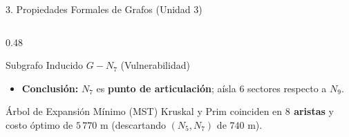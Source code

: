\documentclass[aspectratio=169]{beamer}
\begin{document}
\begin{frame}{3. Propiedades Formales de Grafos (Unidad 3)}
\begin{columns}[T]
\begin{column}{0.48\textwidth}
\begin{alertblock}{Subgrafo Inducido $G - N_7$ (Vulnerabilidad)}
\begin{itemize}
                    \item \textbf{Conclusión:} $N_7$ es \textbf{punto de articulación}; aísla $6$ sectores respecto a $N_9$.
                \end{itemize}
            \end{alertblock}
            \begin{block}{Árbol de Expansión Mínimo (MST)}
                Kruskal y Prim coinciden en \textbf{$8$ aristas} y costo óptimo de \textbf{$5\,770\text{ m}$} (descartando $(N_5, N_7)$ de $740\text{ m}$).
            \end{block}
        \end{column}
    \end{columns}
\end{frame}

\end{document}
